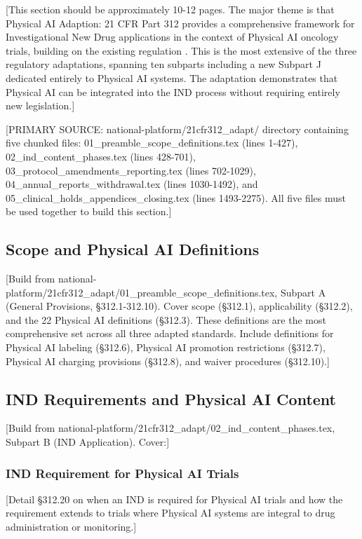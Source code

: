 
[This section should be approximately 10-12 pages. The major theme is that
Physical AI Adaption: 21 CFR Part 312 \cite{cfr312-adapt} provides a
comprehensive framework for Investigational New Drug applications in the
context of Physical AI oncology trials, building on the existing regulation
\cite{cfr-part-312}. This is the most extensive of the three regulatory
adaptations, spanning ten subparts including a new Subpart J dedicated entirely
to Physical AI systems. The adaptation demonstrates that Physical AI can be
integrated into the IND process without requiring entirely new legislation.]

[PRIMARY SOURCE: national-platform/21cfr312\_adapt/ directory containing five
chunked files: 01\_preamble\_scope\_definitions.tex (lines 1-427),
02\_ind\_content\_phases.tex (lines 428-701),
03\_protocol\_amendments\_reporting.tex (lines 702-1029),
04\_annual\_reports\_withdrawal.tex (lines 1030-1492), and
05\_clinical\_holds\_appendices\_closing.tex (lines 1493-2275). All five files
must be used together to build this section.]

\subsection{Scope and Physical AI Definitions}
\label{subsec:cfr312-scope}

[Build from national-platform/21cfr312\_adapt/01\_preamble\_scope\_definitions.tex,
Subpart A (General Provisions, \S 312.1-312.10). Cover scope (\S 312.1),
applicability (\S 312.2), and the 22 Physical AI definitions (\S 312.3).
These definitions are the most comprehensive set across all three adapted
standards. Include definitions for Physical AI labeling (\S 312.6), Physical AI
promotion restrictions (\S 312.7), Physical AI charging provisions (\S 312.8),
and waiver procedures (\S 312.10).]

\subsection{IND Requirements and Physical AI Content}
\label{subsec:cfr312-ind}

[Build from national-platform/21cfr312\_adapt/02\_ind\_content\_phases.tex,
Subpart B (IND Application). Cover:]

\subsubsection{IND Requirement for Physical AI Trials}
[Detail \S 312.20 on when an IND is required for Physical AI trials and how
the requirement extends to trials where Physical AI systems are integral to
drug administration or monitoring.]

